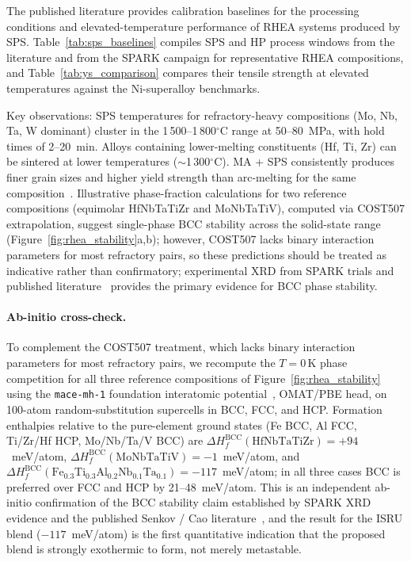 \documentclass[11pt,a4paper]{article}
\begin{document}
The published literature provides calibration baselines for the processing conditions and elevated-temperature performance of RHEA systems produced by SPS. Table~\ref{tab:sps_baselines} compiles SPS and HP process windows from the literature and from the SPARK campaign for representative RHEA compositions, and Table~\ref{tab:ys_comparison} compares their tensile strength at elevated temperatures against the Ni-superalloy benchmarks.

Key observations: SPS temperatures for refractory-heavy compositions (Mo, Nb, Ta, W dominant) cluster in the 1\,500--1\,800$^\circ$C range at 50--80~MPa, with hold times of 2--20~min. Alloys containing lower-melting constituents (Hf, Ti, Zr) can be sintered at lower temperatures ($\sim$1\,300$^\circ$C). MA + SPS consistently produces finer grain sizes and higher yield strength than arc-melting for the same composition~\cite{Cao2019}. Illustrative phase-fraction calculations for two reference compositions (equimolar HfNbTaTiZr and MoNbTaTiV), computed via COST507 extrapolation, suggest single-phase BCC stability across the solid-state range (Figure~\ref{fig:rhea_stability}a,b); however, COST507 lacks binary interaction parameters for most refractory pairs, so these predictions should be treated as indicative rather than confirmatory; experimental XRD from SPARK trials and published literature~\cite{Senkov2011,Cao2019} provides the primary evidence for BCC phase stability.

\paragraph{Ab-initio cross-check.}
To complement the COST507 treatment, which lacks binary interaction parameters for most refractory pairs, we recompute the $T = 0$\,K phase competition for all three reference compositions of Figure~\ref{fig:rhea_stability} using the \texttt{mace-mh-1} foundation interatomic potential~\cite{Batatia2025MACEMH1,Batatia2022MACE}, OMAT/PBE head, on 100-atom random-substitution supercells in BCC, FCC, and HCP. Formation enthalpies relative to the pure-element ground states (Fe BCC, Al FCC, Ti/Zr/Hf HCP, Mo/Nb/Ta/V BCC) are $\Delta H_f^{\text{BCC}}(\text{HfNbTaTiZr}) = +94$~meV/atom, $\Delta H_f^{\text{BCC}}(\text{MoNbTaTiV}) = -1$~meV/atom, and $\Delta H_f^{\text{BCC}}(\text{Fe}_{0.3}\text{Ti}_{0.3}\text{Al}_{0.2}\text{Nb}_{0.1}\text{Ta}_{0.1}) = -117$~meV/atom; in all three cases BCC is preferred over FCC and HCP by 21--48~meV/atom. This is an independent ab-initio confirmation of the BCC stability claim established by SPARK XRD evidence and the published Senkov / Cao literature~\cite{Senkov2011,Cao2019}, and the result for the ISRU blend ($-117$~meV/atom) is the first quantitative indication that the proposed blend is strongly exothermic to form, not merely metastable.
\end{document}

